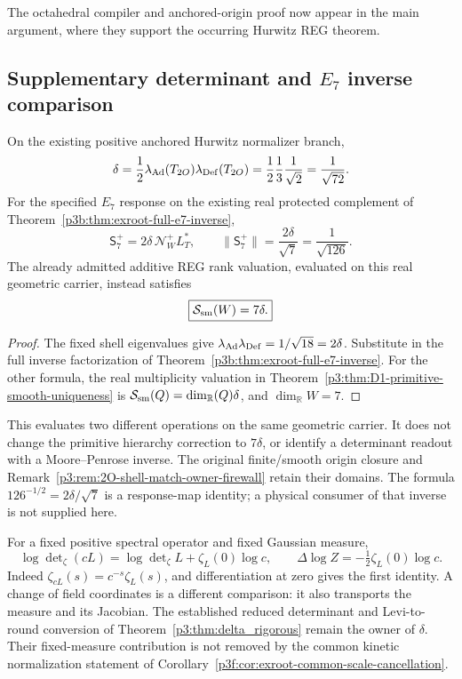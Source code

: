 \documentclass[11pt,a4paper]{article}
\begin{document}
The octahedral compiler and anchored-origin proof now appear in the main argument, where they support the occurring Hurwitz REG theorem.


\subsection{Supplementary determinant and \texorpdfstring{\(E_7\)}{E7} inverse comparison}
\label{p3c:app:exroot-consumer-comparison}

\begin{corollary}
\label{p3c:cor:exroot-delta-inverse}
On the existing positive anchored Hurwitz normalizer branch,
\[
 \delta=\frac12\lambda_{\rm Ad}(T_{2O})
                    \lambda_{\rm Def}(T_{2O})
 =\frac12\frac13\frac1{\sqrt2}
 =\frac1{\sqrt{72}}.
\]
For the specified \(E_7\) response on the existing real protected
complement of Theorem~\ref{p3b:thm:exroot-full-e7-inverse},
\[
 \boxed{\mathsf S_7^+=2\delta\,\mathcal N_W^+L_T^*,\qquad
 \|\mathsf S_7^+\|=\frac{2\delta}{\sqrt7}
                =\frac1{\sqrt{126}}.}
\]
The already admitted additive REG rank valuation, evaluated on this
real geometric carrier, instead satisfies
\[
 \boxed{\mathcal S_{\rm sm}(W)=7\delta.}
\]
\end{corollary}
\begin{proof}
The fixed shell eigenvalues give
\(\lambda_{\rm Ad}\lambda_{\rm Def}=1/\sqrt{18}=2\delta\).
Substitute in the full inverse factorization of
Theorem~\ref{p3b:thm:exroot-full-e7-inverse}.
For the other formula, the real multiplicity valuation in
Theorem~\ref{p3:thm:D1-primitive-smooth-uniqueness} is
\(\mathcal S_{\rm sm}(Q)=\dim_{\mathbb R}(Q)\delta\), and
\(\dim_{\mathbb R}W=7\).
\end{proof}

This evaluates two different operations on the same geometric carrier.
It does not change the primitive hierarchy correction to \(7\delta\),
or identify a determinant readout with a Moore--Penrose inverse.
The original finite/smooth origin closure and
Remark~\ref{p3:rem:2O-shell-match-owner-firewall} retain their domains.
The formula \(126^{-1/2}=2\delta/\sqrt7\) is a response-map identity;
a physical consumer of that inverse is not supplied here.

\begin{remark}
\label{p3c:rem:exroot-measure-scaling}
For a fixed positive spectral operator and fixed Gaussian measure,
\[
 \log\det\nolimits_\zeta(cL)
 =\log\det\nolimits_\zeta L+\zeta_L(0)\log c,\qquad
 \Delta\log Z=-\tfrac12\zeta_L(0)\log c.
\]
Indeed \(\zeta_{cL}(s)=c^{-s}\zeta_L(s)\), and differentiation at zero
gives the first identity. A change of field coordinates is a different
comparison: it also transports the measure and its Jacobian.
The established reduced determinant and Levi-to-round conversion of
Theorem~\ref{p3:thm:delta_rigorous} remain the owner of \(\delta\).
Their fixed-measure contribution is not removed by the common kinetic
normalization statement of
Corollary~\ref{p3f:cor:exroot-common-scale-cancellation}.
\end{remark}
\end{document}
